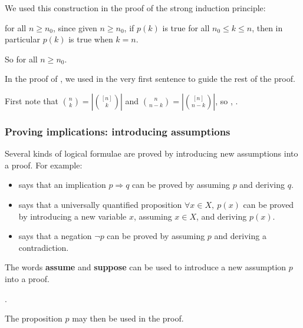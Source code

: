 We used this construction in the proof of the strong induction principle:

\begin{extract}
\label{xtrAssumingImplicationsExample}
 for all $n \ge n_0$, since given $n \ge n_0$, if $p(k)$ is true for all $n_0 \le k \le n$, then in particular $p(k)$ is true when $k=n$.

So  for all $n \ge n_0$.
\end{extract}

In the proof of , we used  in the very first sentence to guide the rest of the proof.

\begin{extract}
\label{xtrAssumingImplicationsExampleTwo}
First note that $\binom{n}{k} = \left| \binom{[n]}{k} \right|$ and $\binom{n}{n-k} = \left| \binom{[n]}{n-k} \right|$, so , .
\end{extract}

\subsubsection*{Proving implications: introducing assumptions}

Several kinds of logical formulae are proved by introducing new assumptions into a proof. For example:
\begin{itemize}
\item {} says that an implication $p \Rightarrow q$ can be proved by assuming $p$ and deriving $q$.
\item {} says that a universally quantified proposition $\forall x \in X,~ p(x)$ can be proved by introducing a new variable $x$, assuming $x \in X$, and deriving $p(x)$.
\item {} says that a negation $\neg p$ can be proved by assuming $p$ and deriving a contradiction.
\end{itemize}

\begin{vocabulary}
\label{vcbTemporaryAssumption}
The words \textbf{assume} and \textbf{suppose} can be used to introduce a new assumption $p$ into a proof.

\begin{vocabtemplate}
 . 
\end{vocabtemplate}

The proposition $p$ may then be used in the proof.
\end{vocabulary}

